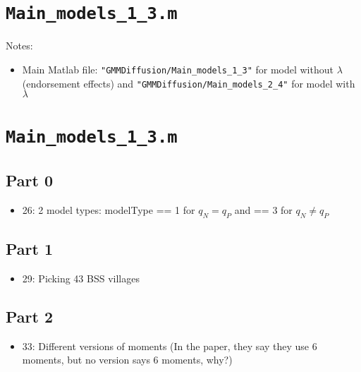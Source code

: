 \documentclass[10pt,letterpaper]{article}
\author{Mizuhiro Suzuki}
\title{}
\begin{document}
\maketitle

\tableofcontents

\section{}

\section{\texttt{Main\_models\_1\_3.m}}\label{main_models_1_3}

Notes:
\begin{itemize}
  \item Main Matlab file: \texttt{"GMMDiffusion/Main\_models\_1\_3"} for model without $\lambda$ (endorsement effects) and \texttt{"GMMDiffusion/Main\_models\_2\_4"} for model with $\lambda$
\end{itemize}

\section{\texttt{Main\_models\_1\_3.m}}\label{main_models_1_3}

\subsection*{Part 0}
\begin{itemize}
  \item 26: 2 model types: modelType == 1 for $q_N = q_P$ and == 3 for $q_N \ne q_P$
\end{itemize}

\subsection{Part 1}
\begin{itemize}
	\item 29: Picking 43 BSS villages
\end{itemize}

\subsection*{Part 2}
\begin{itemize}
  \item 33: Different versions of moments
    (In the paper, they say they use 6 moments, but no version says 6 moments, why?)
\end{itemize}
\end{document}
